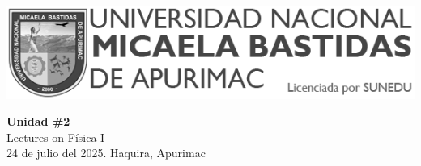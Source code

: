 
\begin{minipage}[l]{0.42\textwidth}
    \includegraphics[width=1\textwidth]{img/logo-UNAMBA.png}
\end{minipage}
\hfill
\begin{minipage}[c]{0.5\textwidth}
    \begin{flushright}
	\large{\textbf{Unidad \#2}}\\
	\large{Lectures on Física I}\\
	\large{24 de julio del 2025. Haquira, Apurimac}\\
    \end{flushright}
\end{minipage}



